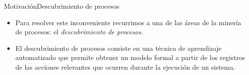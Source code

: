 \documentclass[spanish,pdf]{beamer}
\begin{document}
\begin{frame}{Motivación}{Descubrimiento de procesos}
    \begin{itemize}
      \setlength\itemsep{0.4cm}
      \item<2-> Para resolver este inconveniente recurrimos a una de las áreas de la
                minería de procesos: el \textit{descubrimiento de procesos}.
      \item<3-> El descubrimiento de procesos consiste en una técnica de aprendizaje automatizado
                que permite obtener un modelo formal a partir de los registros de las acciones
                relevantes que ocurren durante la ejecución de un sistema.
                
    \end{itemize}
\end{frame}

%
                                           
\end{document}
